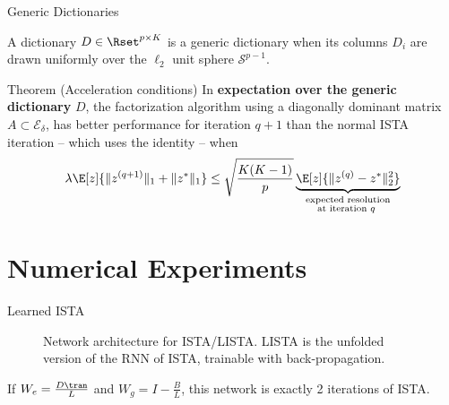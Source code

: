 \documentclass[ignorenonframetext]{beamer}
\def\keypoint#1{\hfill\textcolor{gray}{#1}}
\def\mycite#1{\keypoint{\cite{#1}}}
\begin{document}
\begin{frame}{Generic Dictionaries}
	
	A dictionary $D \in \Rset^{p\times K}$ is a generic dictionary when its columns
	$D_i$ are drawn uniformly over the $\ell_2$ unit sphere $\mathcal S^{p-1}$.

	\begin{block}{Theorem (Acceleration conditions)}
		In \textbf{expectation over the generic dictionary} $D$, the factorization algorithm using a
		diagonally dominant matrix $A\subset\mathcal E_\delta$, has better performance for
		iteration $q+1$ than the normal ISTA iteration -- which uses the identity -- when
		\[
			\lambda\E[z]{\|z^{(q+1)}\|_1+\|z^*\|_1}
				\le \sqrt{\frac{K(K-1)}{p}} \underbrace{\E[z]{\|z^{(q)}-z^*\|_2^2}
				}_{\substack{\text{expected resolution}\\\text{at iteration $q$ }}}
		\]
	\end{block}
\end{frame}

\section{Numerical Experiments}


\begin{frame}{Learned ISTA \hfill\hfill\hfill\hfill\hfill \mycite{Gregor10}}
\begin{figure}[t]
	\centering
	\label{fig:ista}
	\caption{Network architecture for ISTA/LISTA. LISTA is the unfolded version of the RNN of ISTA, trainable with back-propagation.}
\end{figure}
If $W_e = \frac{D\tran}{L} $ and $W_g = I - \frac{B}{L}$, this network is exactly 2 iterations of ISTA.
\end{frame}
\end{document}
